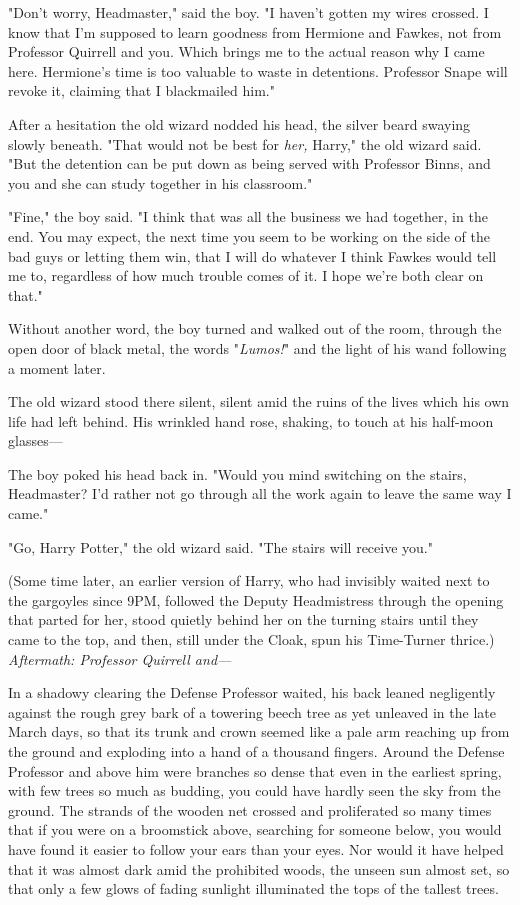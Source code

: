 "Don't worry, Headmaster," said the boy. "I haven't gotten my wires crossed. I 
know that I'm supposed to learn goodness from Hermione and Fawkes, not from 
Professor Quirrell and you. Which brings me to the actual reason why I came 
here. Hermione's time is too valuable to waste in detentions. Professor Snape 
will revoke it, claiming that I blackmailed him."

After a hesitation the old wizard nodded his head, the silver beard swaying 
slowly beneath. "That would not be best for \emph{her,} Harry," the old wizard 
said. "But the detention can be put down as being served with Professor Binns, 
and you and she can study together in his classroom."

"Fine," the boy said. "I think that was all the business we had together, in 
the end. You may expect, the next time you seem to be working on the side of 
the bad guys or letting them win, that I will do whatever I think Fawkes would 
tell me to, regardless of how much trouble comes of it. I hope we're both clear 
on that."

Without another word, the boy turned and walked out of the room, through the 
open door of black metal, the words "\emph{Lumos!}" and the light of his wand 
following a moment later.

The old wizard stood there silent, silent amid the ruins of the lives which his 
own life had left behind. His wrinkled hand rose, shaking, to touch at his 
half-moon glasses---

The boy poked his head back in. "Would you mind switching on the stairs, 
Headmaster? I'd rather not go through all the work again to leave the same way 
I came."

"Go, Harry Potter," the old wizard said. "The stairs will receive you."

(Some time later, an earlier version of Harry, who had invisibly waited next to 
the gargoyles since 9PM, followed the Deputy Headmistress through the opening 
that parted for her, stood quietly behind her on the turning stairs until they 
came to the top, and then, still under the Cloak, spun his Time-Turner thrice.)
\sbreak
\emph{Aftermath: Professor Quirrell and---}

In a shadowy clearing the Defense Professor waited, his back leaned negligently 
against the rough grey bark of a towering beech tree as yet unleaved in the 
late March days, so that its trunk and crown seemed like a pale arm reaching up 
from the ground and exploding into a hand of a thousand fingers. Around the 
Defense Professor and above him were branches so dense that even in the 
earliest spring, with few trees so much as budding, you could have hardly seen 
the sky from the ground. The strands of the wooden net crossed and proliferated 
so many times that if you were on a broomstick above, searching for someone 
below, you would have found it easier to follow your ears than your eyes. Nor 
would it have helped that it was almost dark amid the prohibited woods, the 
unseen sun almost set, so that only a few glows of fading sunlight illuminated 
the tops of the tallest trees.

